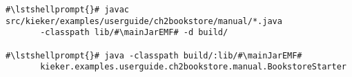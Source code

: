 \begin{lstlisting}[caption=Commands to compile and run the instrumented Bookstore under \UnixLikeSystems{},label=lst:bookstoreStarterLinux]
#\lstshellprompt{}# javac src/kieker/examples/userguide/ch2bookstore/manual/*.java 
       -classpath lib/#\mainJarEMF# -d build/

#\lstshellprompt{}# java -classpath build/:lib/#\mainJarEMF#
       kieker.examples.userguide.ch2bookstore.manual.BookstoreStarter
\end{lstlisting} 